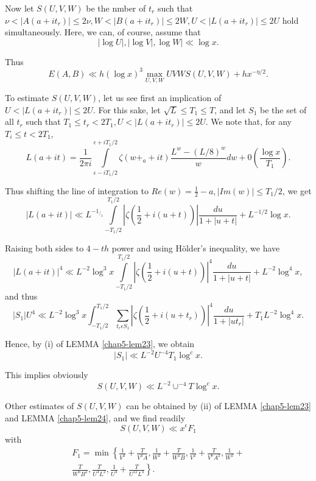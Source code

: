 Now let $S(U,V,W)$ be the nmber of $t_r$ such that $\nu < |A(a+ i t_r)|
\leq 2\nu, W < |B (a + i t_r)| \leq 2W, U < | L(a+it_r ) | \leq
2 U$ hold simultaneously. Here, we can, of course, assume that  
$$
| \log U |, | \log V |, \log W | \ll \log x.
$$

Thus
\begin{equation*}
E (A, B) \ll h ( \log x )^3  \max_{U,V,W} UVWS (U,V,W) + hx ^{-\eta
  /2}. \tag{6.1.18} \label{eq6.1.18}
\end{equation*}

To estimate $S(U,V,W)$, let us see first an implication of $U < | L (a +
it_r) | \leq 2 U$. For this sake, let $\sqrt{L} \leq T_1 \leq T$,
and let $S_1$ be the set of  all $t_r$ such that $ T_1 \leq t_r <
2T_1, U < | L (a + it_r)| \leq 2U$. We note that, for any $T_i \leq
t < 2 T_1$,   
$$
 L(a+it) = \frac{1}{2 \pi i} \int\limits_{\epsilon  - i
   T_1/2}^{\epsilon  + iT_1/2} \zeta(w +_a + it) \frac{L^w -
   (L/8)^w}{w}dw + 0 \left( \frac{ \log x}{T_1}\right). 
$$\pageoriginale

Thus shifting the line of integration to $Re(w) = \frac{1}{2}-a, | Im
(w) | \leq T_1 /2 $, we get 
$$
 | L (a+it)| \ll L^{-1_{/_{2}}} \int\limits_{-T_1/2}^{T_1/2}| \zeta
 \left(\frac{1}{2} + i(u +t)\right) | \frac{du}{1+ | u + t |} + L^{-{1/2}}
 \log x.  
$$

Raising both sides to $4 - th$ power and using H\"{o}lder's inequality, we have 
$$
|L (a+it)|^4\ll L^{-2}\log^3 x \int\limits_{-T_1 /2}^{T_1 /2} | \zeta
\left(\frac{1}{2} + i (u + t)\right)|^4  \frac{du}{1 + |u + t|}+
L^{-2} \log^4 x,  
$$
and thus
{\fontsize{10pt}{12pt}\selectfont
$$
|S_1 | U^4 \ll L^{-2 } \log^3 x \int_{- T_1/2}^{T_1/2} \sum_{ t_r
  \epsilon  S_1}|\zeta \left(\frac{1}{2} + i(u +t_r)\right)|^4 \frac{du}{1
  +|ut_r|}+T_1 L^{-2} \log^4 x. 
$$}\relax

Hence, by (i) of LEMMA \ref{chap5-lem23}, we obtain
$$
| S_1 | \ll L^{-2}U^{-4}T_1 \log^c x.
$$

This implies  obviously
$$
S(U,V,W) \ll L^{-2 }\cup ^{-4} T \log ^c x.
$$

Other estimates of $S(U,V,W)$ can be obtained by (ii) of LEMMA
\ref{chap5-lem23} and LEMMA \ref{chap5-lem24}, and we find readily 
\begin{equation*}
S(U,V,W) \ll x^\epsilon  F_1 \tag{6.1.19}\label{eq6.1.19}
\end{equation*}
with
\begin{multline*}
  F_1 = \min 
  \left\{\frac{1}{V^2} +\frac{T}{V^2A}, \frac{1}{W^2} +
  \frac{T}{W^2 B}, \frac{1}{V^2} + \frac{T}{V^6 A^2}, \frac{1}{W^2}+\right.\\
  \left. \frac{T}{W^6 B^2}, \frac{T}{U^4 L^2}, \frac{1}{U^4} +
  \frac{T}{U^{12}L^4} \right\}. 
\end{multline*}\pageoriginale

